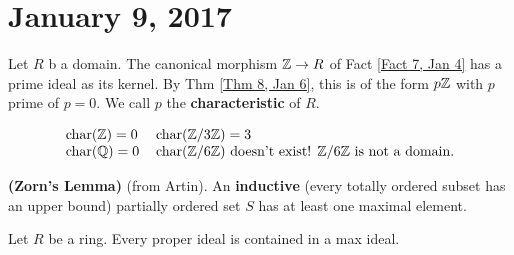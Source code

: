 \section{January 9, 2017}
\begin{defn} \label{Defn 1, Jan 9}
    Let $R$ b a domain. The canonical morphism $\mathbb{Z} \rightarrow R$ of Fact \ref{Fact 7, Jan 4} has
    a prime ideal as its kernel. By Thm \ref{Thm 8, Jan 6}, this is of the form
    $p\mathbb{Z}$ with $p$ prime of $p = 0$. We call $p$ the \textbf{characteristic} of $R$.
\end{defn}
\begin{ex}
\[
\begin{tabular}{ll}
    char$(\ZZ) = 0$ & char$(\Zn 3) = 3$ \\
    char$(\QQ) = 0$ & char$(\Zn 6)$ doesn't exist! $\Zn 6 $ is not a domain.
\end{tabular}
\]
\end{ex}
\begin{unnumlemma}
\textbf{(Zorn's Lemma)} (from Artin). An \textbf{inductive} (every totally ordered
subset has an upper bound) partially ordered set $S$ has at least one maximal element.
\end{unnumlemma}
\begin{thm}\label{Thm 2, Jan 9}
    Let $R$ be a ring. Every proper ideal is contained in a max ideal.
\end{thm}
